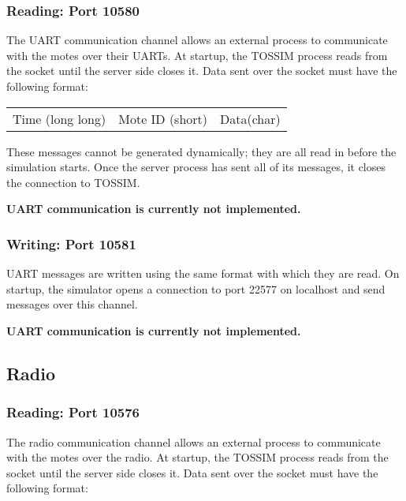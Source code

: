 \documentclass[12pt]{article}
\begin{document}
\subsubsection*{Reading: Port 10580}

The UART communication channel allows an external process to
communicate with the motes over their UARTs. At startup, the TOSSIM
process reads from the socket until the server side closes it. Data
sent over the socket must have the following format:

\vspace{0.1in}
\begin{tabular}{|c|c|c|}\hline
\hspace{4in} & \hspace{1in} & \hspace{0.5in} \\ \hline
Time (long long)& Mote ID (short) & Data(char) \\ \hline
\end{tabular}
\vspace{0.1in}

These messages cannot be generated dynamically; they are all read in
before the simulation starts. Once the server process has sent all of
its messages, it closes the connection to TOSSIM.

{\bf UART communication is currently not implemented.}

\subsubsection*{Writing: Port 10581}

UART messages are written using the same format with which they are
read. On startup, the simulator opens a connection to port 22577 on
localhost and send messages over this channel.

{\bf UART communication is currently not implemented.}

\subsection*{Radio}
\subsubsection*{Reading: Port 10576}

The radio communication channel allows an external process to
communicate with the motes over the radio. At startup, the TOSSIM
process reads from the socket until the server side closes it. Data
sent over the socket must have the following format:
\end{document}
